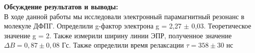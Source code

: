 \documentclass[a4paper, 12pt]{article}%
\begin{document}
\begin{enumerate}
		
		\textbf{Обсуждение результатов и выводы: }\\
		
		В ходе данной работы мы исследовали электронный парамагнитный резонанс в молекуле ДФПГ. Определили g-фактор электрона g = 2,27 $\pm$ 0,03. Теоретическое значение g = 2. Также измерили ширину линии ЭПР, полученное значение $\Delta B = 0,87 \pm 0,08$ Гс. Также определили время релаксации $\tau = 358 \pm 30 \text{ нс}$ 
		
		
		
		
		
		
		
		
		
		
		
		
		
		
		
		
		
		
		
		
		
		
		
		
		
		
		
		
		
		
		
		
	\end{enumerate}
	
	
	
	
	
	
	
	
\end{document}
